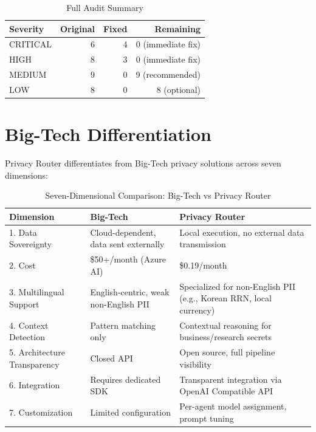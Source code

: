 \documentclass[11pt,a4paper]{article}
\begin{document}
\begin{table}[h]
\centering
\begin{tabular}{@{}lrrr@{}}
\toprule
Severity & Original & Fixed & Remaining \\
\midrule
CRITICAL & 6 & 4 & 0 (immediate fix) \\
HIGH & 8 & 3 & 0 (immediate fix) \\
MEDIUM & 9 & 0 & 9 (recommended) \\
LOW & 8 & 0 & 8 (optional) \\
\bottomrule
\end{tabular}
\caption{Full Audit Summary}
\end{table}

\section{Big-Tech Differentiation}

Privacy Router differentiates from Big-Tech privacy solutions across seven dimensions:

\begin{table}[h]
\centering
\begin{tabular}{@{}p{2.5cm}p{4cm}p{4cm}@{}}
\toprule
Dimension & Big-Tech & Privacy Router \\
\midrule
1. Data Sovereignty & Cloud-dependent, data sent externally & Local execution, no external data transmission \\
2. Cost & \$50+/month (Azure AI) & \$0.19/month \\
3. Multilingual Support & English-centric, weak non-English PII & Specialized for non-English PII (e.g., Korean RRN, local currency) \\
4. Context Detection & Pattern matching only & Contextual reasoning for business/research secrets \\
5. Architecture Transparency & Closed API & Open source, full pipeline visibility \\
6. Integration & Requires dedicated SDK & Transparent integration via OpenAI Compatible API \\
7. Customization & Limited configuration & Per-agent model assignment, prompt tuning \\
\bottomrule
\end{tabular}
\caption{Seven-Dimensional Comparison: Big-Tech vs Privacy Router}
\end{table}
\end{document}
